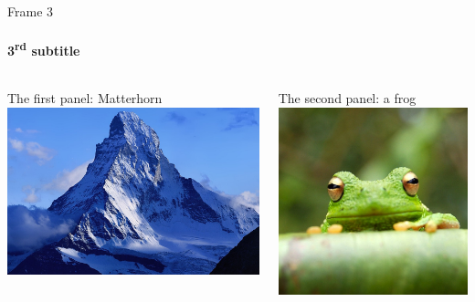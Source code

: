 \documentclass{beamer}
\begin{document}
\begin{frame}{Frame 3}
    \framesubtitle{3\textsuperscript{rd} subtitle}

\begin{columns}[T]

    \begin{column}{.5\textwidth}
        \begin{block}{The first panel: Matterhorn}
            \includegraphics[width=\textwidth]{matterhorn.jpg}
        \end{block}
    \end{column}

    \begin{column}{.5\textwidth}
        \begin{block}{The second panel: a frog}
            \includegraphics[width=\textwidth]{frog.jpg}
        \end{block}
    \end{column}

\end{columns}   
  
\end{frame}
 
\end{document}
